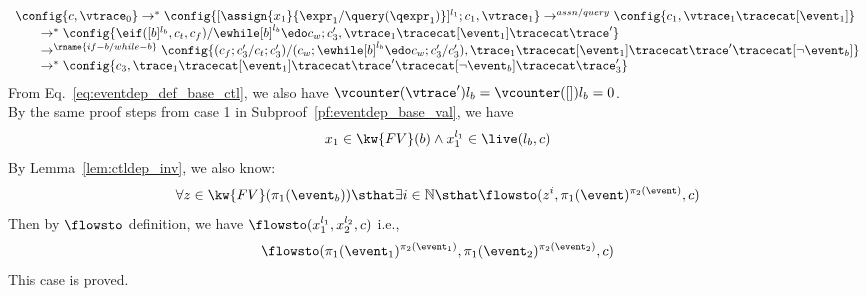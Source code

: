 \begin{subproof}
\begin{equation}
\label{eq:ctldep_inv2}
\begin{array}{l}   
  \config{{c}, \vtrace_0} \rightarrow^{*} 
  \config{[\assign{{x}_1}{\expr_1 / \query(\qexpr_1)}]^{l_1} ; {c}_1, \vtrace_1}  
  \rightarrow^{assn/query}
   \config{c_1, \vtrace_1 \tracecat [\event_1]} 
   \\
    \qquad \rightarrow^{*} 
    \config{\eif ([b]^{l_b}, c_t, c_f) / \ewhile [b]^{l_b} \edo c_w;{c}_3', 
    \vtrace_1 \tracecat [\event_1] \tracecat \trace'} 
    \\
    \qquad 
     \rightarrow^{\rname{if-b / while-b}} 
    \config{(c_f;c_3' / c_t;c_3') /(c_w; \ewhile [b]^{l_b} \edo c_w;{c}_3' / c_3'), 
    \trace_1 \tracecat [\event_1]  \tracecat \trace' \tracecat [\neg \event_b]} 
    \\
    \qquad   \rightarrow^{*} 
    \config{c_3, 
    \trace_1 \tracecat [\event_1]  \tracecat \trace' \tracecat [\neg \event_b] \tracecat  \trace_3'}
  \end{array}
\end{equation}
%
From Eq.~\ref{eq:eventdep_def_base_ctl}, we also have
  $\vcounter(\vtrace') l_b = \vcounter( [] ) l_b = 0$.
\\
%
%
By the same proof steps from case 1 in Subproof~\ref{pf:eventdep_base_val}, we have
\[
  x_1 \in \kw{FV}(b)  \land x_1^{l_1} \in \live(l_b, c)
\]
%
By Lemma~\ref{lem:ctldep_inv}, we also know:
\[
  \forall z \in \kw{FV}(\pi_1(\event_b)) \sthat  \exists i \in \mathbb{N} \sthat 
\flowsto(z^i, \pi_1(\event)^{\pi_2(\event)}, c)
\]
%
Then by $\flowsto$ definition, we have $\flowsto(x_1^{l_1}, {x}_2^{l_2}, c)$
%
i.e.,
%
\[
\flowsto(\pi_1(\event_1)^{\pi_2(\event_1)}, \pi_1(\event_2)^{\pi_2(\event_2)}, c)
 \]
%
This case is proved.
\end{subproof}